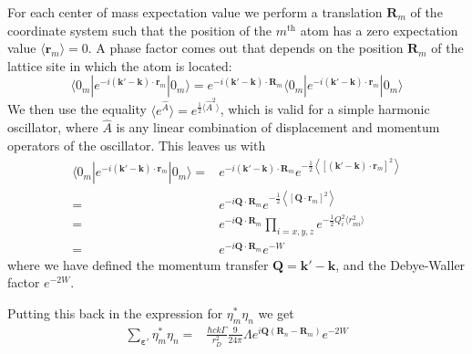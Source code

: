 \documentclass[11pt,letter]{article}
\newcommand{\bv}[1]{\ensuremath{\bm{#1}}}
\begin{document}
For each center of mass expectation value we perform a translation $\bv{R}_{m}$
of the coordinate system such that the position of the $m^{\text{th}}$ atom has
a zero expectation value $\langle \bv{r}_{m} \rangle = 0$.  A phase factor
comes out that depends on the position $\bv{R}_{m}$ of the lattice site in
which the atom is located:
\begin{equation}
      \langle 0_{m} | e^{-i(\bv{k}'-\bv{k}) \cdot\bv{r}_{m}} | 0_{m}  \rangle 
    = e^{-i(\bv{k}'-\bv{k}) \cdot\bv{R}_{m}} 
      \langle 0_{m} | e^{-i(\bv{k}'-\bv{k}) \cdot\bv{r}_{m}} | 0_{m}  \rangle
\end{equation} 
We then use the equality $\langle e^{\hat{A}} \rangle = e^{\frac{1}{2} \langle
\hat{A}^{2} \rangle }$, which is valid for a simple harmonic oscillator, where
$\hat{A}$ is any linear combination of displacement and momentum operators of
the oscillator.  This leaves us with
\begin{equation}
\begin{split}
      \langle 0_{m} | e^{-i(\bv{k}'-\bv{k}) \cdot\bv{r}_{m}} | 0_{m}  \rangle 
    = & e^{-i(\bv{k}'-\bv{k}) \cdot\bv{R}_{m}} 
      e^{ -\frac{1}{2} \left\langle 
          [ (\bv{k}'-\bv{k}) \cdot\bv{r}_{m} ]^{2} \right\rangle } \\
    = & e^{ -i \bv{Q} \cdot \bv{R}_{m}} 
      e^{ -\frac{1}{2} \left\langle [ \bv{Q} \cdot\bv{r}_{m} ]^{2} \right\rangle } \\ 
    = & e^{ -i \bv{Q} \cdot \bv{R}_{m}}
      \prod_{i=x,y,z} e^{ - \frac{1}{2}Q_{i}^{2}\langle r_{mi} ^{2} \rangle } \\ 
    = & e^{ -i \bv{Q} \cdot \bv{R}_{m}}
      e^{-W} 
\end{split}
\end{equation} 
where we have defined the momentum transfer $\bv{Q} = \bv{k}' - \bv{k}$,  and
the Debye-Waller factor $e^{-2W}$. 

Putting this back in the expression for $\eta_{m}^{*}\eta_{n}$ we get
\begin{equation}
\begin{split}
 \sum_{\bv{\varepsilon}' } \eta_{m}^{*}\eta_{n} = & 
 \frac{\hbar c k \Gamma}{r_{D}^{2}}  
    \frac{9}{24\pi} \Lambda
       e^{ i \bv{Q}( \bv{R}_{n} - \bv{R}_{m} ) } e^{-2W} 
\end{split}
\end{equation}
\end{document}
